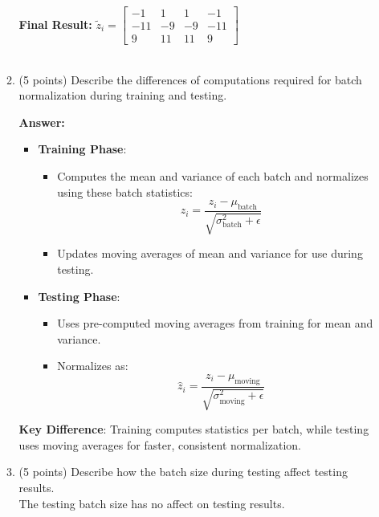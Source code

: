 \documentclass[11pt]{article}
\begin{document}
\begin{enumerate}
\begin{enumerate}
    \textbf{Final Result: } $\tilde z_i = \begin{bmatrix}
        -1&1&1&-1\\-11&-9&-9&-11\\9&11&11&9
    \end{bmatrix}$\\\\
    
    \item (5 points) Describe the differences of computations required for batch normalization
    during training and testing.

    \textbf{Answer: }
    \begin{itemize}
        \item \textbf{Training Phase}:
   \begin{itemize}
       \item Computes the mean and variance of each batch and normalizes using these batch statistics:
       \[\hat{z}_i = \frac{z_i - \mu_{\text{batch}}}{\sqrt{\sigma_{\text{batch}}^2 + \epsilon}}\]
       \item Updates moving averages of mean and variance for use during testing.\\
   \end{itemize}

    \item \textbf{Testing Phase}:
   \begin{itemize}
       \item Uses pre-computed moving averages from training for mean and variance.
       \item Normalizes as:
       \[\hat{z}_i = \frac{z_i - \mu_{\text{moving}}}{\sqrt{\sigma_{\text{moving}}^2 + \epsilon}}\]
   \end{itemize}
   \end{itemize}

\textbf{Key Difference}: Training computes statistics per batch, while testing uses moving averages for faster, consistent normalization.\\

    \item (5 points) Describe how the batch size during testing affect testing results.\\

    The testing batch size has no affect on testing results.
    
    \end{enumerate}
    

\end{enumerate}
\end{document}
